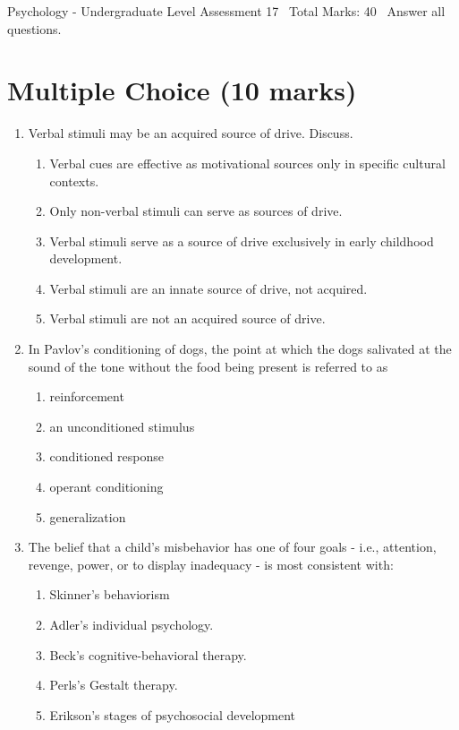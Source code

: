 \documentclass[12pt]{article}
\begin{document}
\begin{center}
Psychology - Undergraduate Level Assessment 17 \
Total Marks: 40 \
Answer all questions.
\end{center}

\section*{Multiple Choice (10 marks)}
\begin{enumerate}[label=\arabic*.]
\item Verbal stimuli may be an acquired source of drive. Discuss.
\begin{enumerate}[label=(\alph*)]
    \item Verbal cues are effective as motivational sources only in specific cultural contexts.
    \item Only non-verbal stimuli can serve as sources of drive.
    \item Verbal stimuli serve as a source of drive exclusively in early childhood development.
    \item Verbal stimuli are an innate source of drive, not acquired.
    \item Verbal stimuli are not an acquired source of drive.
\end{enumerate}
\item In Pavlov's conditioning of dogs, the point at which the dogs salivated at the sound of the tone without the food being present is referred to as
\begin{enumerate}[label=(\alph*)]
    \item reinforcement
    \item an unconditioned stimulus
    \item conditioned response
    \item operant conditioning
    \item generalization
\end{enumerate}
\item The belief that a child's misbehavior has one of four goals - i.e., attention, revenge, power, or to display inadequacy - is most consistent with:
\begin{enumerate}[label=(\alph*)]
    \item Skinner's behaviorism
    \item Adler's individual psychology.
    \item Beck's cognitive-behavioral therapy.
    \item Perls's Gestalt therapy.
    \item Erikson's stages of psychosocial development

\end{enumerate}
\end{enumerate}
\end{document}
